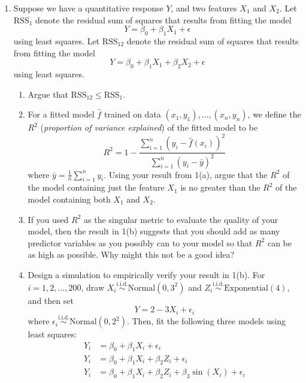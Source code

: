 \documentclass[12pt]{article}
\begin{document}
\begin{enumerate}
    \item Suppose we have a quantitative response $Y$, and two features $X_1$ and $X_2$. Let $\text{RSS}_1$ denote the residual sum of squares that results from fitting the model $$Y = \beta_0 + \beta_1 X_1 + \epsilon$$ using least squares. 
   Let $\text{RSS}_{12}$ denote the residual sum of squares that results from fitting the model
   $$Y = \beta_0 + \beta_1 X_1 + \beta_2 X_2 +  \epsilon$$ using least squares. 
   \begin{enumerate}
   \item  Argue that $\text{RSS}_{12} \leq \text{RSS}_1$.
   \item For a fitted model $\hat{f}$ trained on data $(x_1, y_1), \dots, (x_n, y_n)$, we define the $R^2$ (\textit{proportion of variance explained}) of the fitted model to be $$R^2 = 1 - \dfrac{\sum_{i=1}^n (y_i - \hat{f}(x_i))^2}{\sum_{i=1}^n (y_i - \bar{y})^2}$$ where $\bar{y} = \frac{1}{n} \sum_{i=1}^n y_i$. Using your result from 1(a), argue that the $R^2$ of the model containing just the feature $X_1$ is no greater than the $R^2$ of the model containing both $X_1$ and $X_2$. 

   \item If you used $R^2$ as the singular metric to evaluate the quality of your model, then the result in 1(b) suggests that you should add as many predictor variables as you possibly can to your model so that $R^2$ can be as high as possible. Why might this not be a good idea?

    \item Design a simulation to empirically verify your result in 1(b). For $i = 1, 2, \dots, 200$, draw $X_i \overset{\text{i.i.d.}}{\sim} \text{Normal}(0, 3^2)$ and $Z_i \overset{\text{i.i.d.}}{\sim} \text{Exponential}(4)$, and then set \begin{equation}
   Y = 2 - 3 X_i + \epsilon_i
   \label{eq:model}
   \end{equation}
   where $\epsilon_i \overset{\text{i.i.d.}}{\sim} \text{Normal}(0, 2^2)$. Then, fit the following three models using least squares:
    \begin{align*}
        Y_i &= \beta_0 + \beta_1 X_i + \epsilon_i \\
        Y_i &= \beta_0 + \beta_1 X_i + \beta_2 Z_i + \epsilon_i \\
        Y_i &= \beta_0 + \beta_1 X_i + \beta_2 Z_i + \beta_3 \sin(X_i) + \epsilon_i
    \end{align*}


\end{enumerate}
\end{enumerate}
\end{document}
